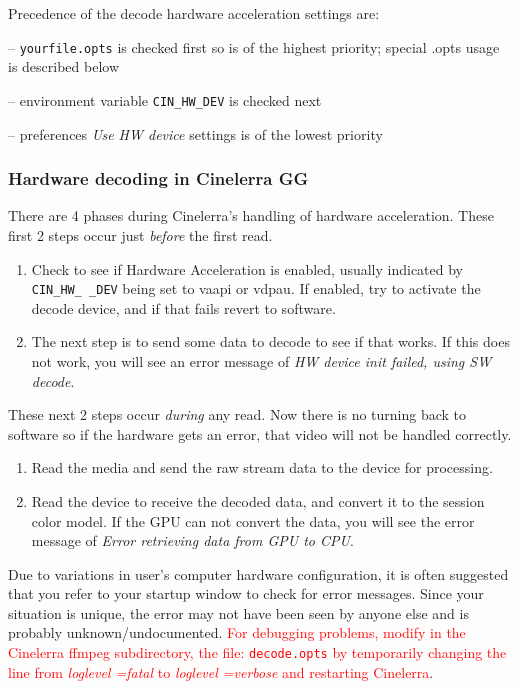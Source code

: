 Precedence of the decode hardware acceleration settings are:

-- \texttt{yourfile.opts} is checked first so is of the highest priority; special .opts usage is described below

-- environment variable \texttt{CIN\_HW\_DEV} is checked next

-- preferences \textit{Use HW device} settings is of the lowest priority

\subsubsection*{Hardware decoding in Cinelerra GG}%
\label{ssub:hardware_decoding_cinelerra}

There are 4 phases during Cinelerra’s handling of hardware acceleration. These first 2 steps occur just \textit{before} the first read.

\begin{enumerate}
	\item Check to see if Hardware Acceleration is enabled, usually indicated by \texttt{CIN\_HW\_ \_DEV} being set to
	vaapi or vdpau.  If enabled, try to activate the decode device, and if that fails revert to software.
	\item The next step is to send some data to decode to see if that works. If this does not work, you will see
	an error message of \textit{HW device init failed, using SW decode}.
\end{enumerate}

\noindent These next 2 steps occur \textit{during} any read.  Now there is no turning back to software so if the hardware gets an error, that video will not be handled correctly.

\begin{enumerate} [resume]
	\item Read the media and send the raw stream data to the device for processing.
	\item Read the device to receive the decoded data, and convert it to the session color model.  If the GPU
	can not convert the data, you will see the error message of \textit{Error retrieving data from GPU to CPU}.
\end{enumerate}

Due to variations in user’s computer hardware configuration, it is often suggested that you refer to your startup window to check for error messages.   Since your situation is unique, the error may not have been seen by anyone else and is probably unknown/undocumented.
\textcolor{red}{For debugging problems, modify in the Cinelerra ffmpeg subdirectory, the file:  \texttt{decode.opts}   by temporarily changing the line from \textit{loglevel =fatal} to \textit{loglevel =verbose} and restarting Cinelerra}.  

